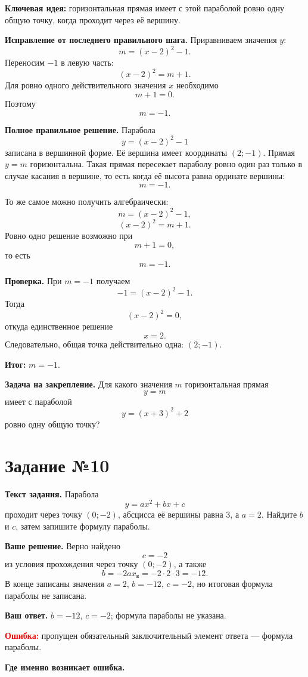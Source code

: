 \documentclass[12pt,a4paper]{article}
\begin{document}
\textcolor{blue!60!black}{\textbf{Ключевая идея:}} горизонтальная прямая имеет с этой параболой ровно одну общую точку, когда проходит через её вершину.

\textbf{Исправление от последнего правильного шага.}
Приравниваем значения $y$:
\[
m=(x-2)^2-1.
\]
Переносим $-1$ в левую часть:
\[
(x-2)^2=m+1.
\]
Для ровно одного действительного значения $x$ необходимо
\[
m+1=0.
\]
Поэтому
\[
m=-1.
\]

\textbf{Полное правильное решение.}
Парабола
\[
y=(x-2)^2-1
\]
записана в вершинной форме. Её вершина имеет координаты $(2;-1)$. Прямая $y=m$ горизонтальна. Такая прямая пересекает параболу ровно один раз только в случае касания в вершине, то есть когда её высота равна ординате вершины:
\[
m=-1.
\]

То же самое можно получить алгебраически:
\[
m=(x-2)^2-1,
\]
\[
(x-2)^2=m+1.
\]
Ровно одно решение возможно при
\[
m+1=0,
\]
то есть
\[
m=-1.
\]

\textbf{Проверка.}
При $m=-1$ получаем
\[
-1=(x-2)^2-1.
\]
Тогда
\[
(x-2)^2=0,
\]
откуда единственное решение
\[
x=2.
\]
Следовательно, общая точка действительно одна: $(2;-1)$.

\textcolor{teal!60!black}{\textbf{Итог:}} $m=-1$.

\textbf{Задача на закрепление.}
Для какого значения $m$ горизонтальная прямая
\[
y=m
\]
имеет с параболой
\[
y=(x+3)^2+2
\]
ровно одну общую точку?

\newpage
{}\label{task:10}
\section*{Задание №10}

\textbf{Текст задания.}
Парабола
\[
y=ax^2+bx+c
\]
проходит через точку $(0;-2)$, абсцисса её вершины равна $3$, а $a=2$. Найдите $b$ и $c$, затем запишите формулу параболы.

\textbf{Ваше решение.}
Верно найдено
\[
c=-2
\]
из условия прохождения через точку $(0;-2)$, а также
\[
b=-2ax_{\text{в}}=-2\cdot 2\cdot 3=-12.
\]
В конце записаны значения $a=2$, $b=-12$, $c=-2$, но итоговая формула параболы не записана.

\textbf{Ваш ответ.}
$b=-12$, $c=-2$; формула параболы не указана.

\textcolor{red}{\textbf{Ошибка:}} пропущен обязательный заключительный элемент ответа --- формула параболы.

\textbf{Где именно возникает ошибка.}
\end{document}
